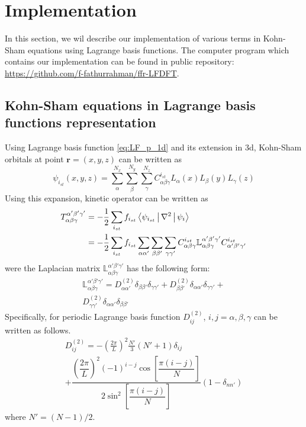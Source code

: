 \section{Implementation}

In this section, we wil describe our implementation of various terms 
in Kohn-Sham equations using Lagrange basis functions.
The computer program which contains our implementation can be found in public
repository: \url{https://github.com/f-fathurrahman/ffr-LFDFT}.

\subsection{Kohn-Sham equations in Lagrange basis functions representation}

Using Lagrange basis function \ref{eq:LF_p_1d} and its extension in 3d, Kohn-Sham orbitals
at point $\mathbf{r} = (x,y,z)$ can be written as
\begin{equation}
\psi_{i_{st}}(x,y,z) = \sum_{\alpha}^{N_x} \sum_{\beta}^{N_y} \sum_{\gamma}^{N_z}
C_{\alpha\beta\gamma}^{i_{st}} L_{\alpha}(x) L_{\beta}(y) L_{\gamma}(z)
\end{equation}
%
Using this expansion, kinetic operator can be written as
\begin{align}
T_{\alpha\beta\gamma}^{\alpha'\beta'\gamma'} & = -\frac{1}{2} \sum_{i_{st}} f_{i_{st}}
\Braket{ \psi_{i_{st}} | \nabla^2 | \psi_{i} } \\
& =
-\frac{1}{2}
\sum_{i_{st}} f_{i_{st}} \sum_{\alpha\alpha'} \sum_{\beta\beta'} \sum_{\gamma\gamma'}
C^{i_{st}}_{\alpha\beta\gamma} \mathbb{L}_{\alpha\beta\gamma}^{\alpha'\beta'\gamma'}
C^{i_{st}}_{\alpha'\beta'\gamma'}
\end{align}
%
were the Laplacian matrix $\mathbb{L}_{\alpha\beta\gamma}^{\alpha'\beta'\gamma'}$
has the following form:
\begin{multline}
\mathbb{L}_{\alpha\beta\gamma}^{\alpha'\beta'\gamma'} =
D^{(2)}_{\alpha\alpha'}\delta_{\beta\beta'}\delta_{\gamma\gamma'} +
D^{(2)}_{\beta\beta'}\delta_{\alpha\alpha'}\delta_{\gamma\gamma'} + \\
D^{(2)}_{\gamma\gamma'}\delta_{\alpha\alpha'}\delta_{\beta\beta'}
\end{multline}
%
Specifically, for periodic Lagrange basis function $D^{(2)}_{ij}$, $i, j = \alpha, \beta, \gamma$
can be written as follows.
\begin{multline}
D^{(2)}_{ij} = -\left( \frac{2\pi}{L} \right)^2 \frac{N'}{3} \left( N' + 1 \right) \delta_{ij} \\
+ \dfrac{ \left(\dfrac{2\pi}{L}\right)^2 (-1)^{i-j}\cos\left[\dfrac{\pi(i-j)}{N}\right]}
{2\sin^2\left[\dfrac{\pi(i-j)}{N}\right]}
(1-\delta_{nn'})
\label{eq:kin1d_p}
\end{multline}
where $N' = (N-1)/2$.

